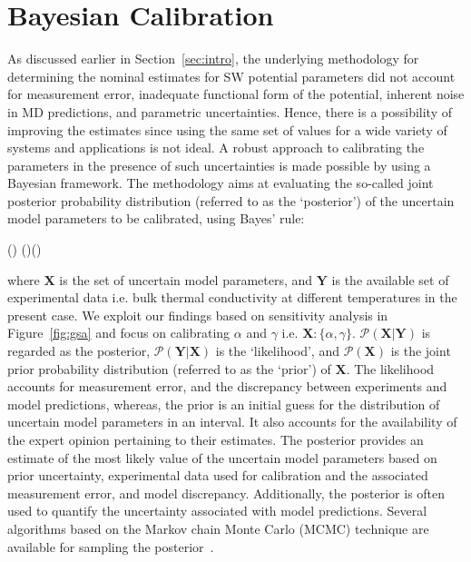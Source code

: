 \section{Bayesian Calibration}
\label{sec:bayes}

As discussed earlier in Section~\ref{sec:intro}, the underlying methodology for determining the nominal 
estimates for SW potential parameters did not account for measurement error, inadequate functional
form of the potential, inherent noise in MD predictions, and parametric uncertainties. Hence, there is
a possibility of improving the estimates since using the same set of values for a wide variety of systems
and applications is not ideal. A robust approach to calibrating the parameters in the presence of
such uncertainties is made possible by using a Bayesian framework. The methodology aims at evaluating
the so-called joint posterior probability distribution (referred to as the `posterior') of the uncertain model 
parameters to be calibrated, using Bayes' rule:

\be
{}(\vert {}) \propto {}(\vert{})()
\ee

\noindent where $\bm{X}$ is the set of uncertain model parameters, and $\bm{Y}$ is the available set of
experimental data i.e. bulk thermal conductivity at different temperatures in the present case. 
We exploit our findings based on sensitivity analysis in
Figure~\ref{fig:gsa} and focus on calibrating $\alpha$ and $\gamma$ i.e. $\bm{X}:\{\alpha,\gamma\}$.
$\mathcal{P}(\bm{X}\vert \bm{Y})$ is regarded as the posterior, $\mathcal{P}(\bm{Y}\vert\bm{X})$ is the
`likelihood', and $\mathcal{P}(\bm{X})$ is the joint prior probability distribution (referred to as the `prior') of $\bm{X}$.
The likelihood accounts for measurement error, and the discrepancy between experiments and model
predictions, whereas, the prior is an initial guess for the distribution of uncertain model parameters in an
interval. It also accounts for the availability of the expert opinion pertaining to their estimates. 
The posterior provides an estimate of the most likely value of the uncertain model parameters based on
prior uncertainty, experimental data used for calibration and the associated measurement error, and model
discrepancy. Additionally, the posterior is often used to quantify the uncertainty associated with model predictions. Several algorithms based on the Markov chain Monte Carlo (MCMC) technique are available for  
sampling the posterior~\cite{Haario:2001, Haario:2006,Xu:2014}.

